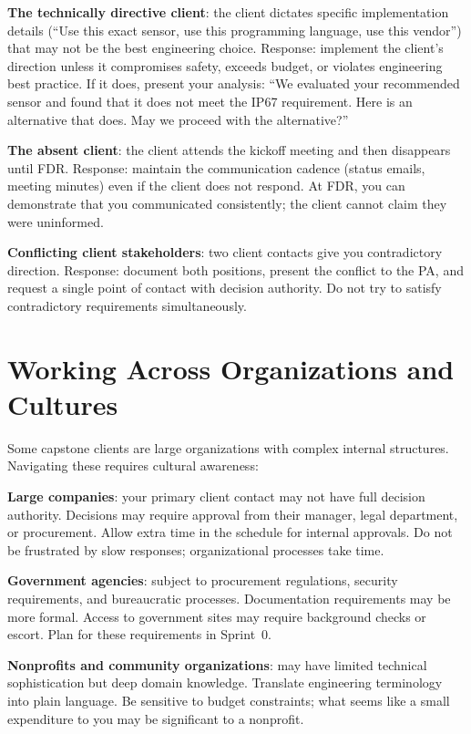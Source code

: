 \textbf{The technically directive client}: the client dictates specific implementation details (``Use this exact sensor, use this programming language, use this vendor'') that may not be the best engineering choice. Response: implement the client's direction unless it compromises safety, exceeds budget, or violates engineering best practice. If it does, present your analysis: ``We evaluated your recommended sensor and found that it does not meet the IP67 requirement. Here is an alternative that does. May we proceed with the alternative?''

\textbf{The absent client}: the client attends the kickoff meeting and then disappears until FDR. Response: maintain the communication cadence (status emails, meeting minutes) even if the client does not respond. At FDR, you can demonstrate that you communicated consistently; the client cannot claim they were uninformed.

\textbf{Conflicting client stakeholders}: two client contacts give you contradictory direction. Response: document both positions, present the conflict to the PA, and request a single point of contact with decision authority. Do not try to satisfy contradictory requirements simultaneously.



\section{Working Across Organizations and Cultures}
Some capstone clients are large organizations with complex internal structures. Navigating these requires cultural awareness:

\textbf{Large companies}: your primary client contact may not have full decision authority. Decisions may require approval from their manager, legal department, or procurement. Allow extra time in the schedule for internal approvals. Do not be frustrated by slow responses; organizational processes take time.

\textbf{Government agencies}: subject to procurement regulations, security requirements, and bureaucratic processes. Documentation requirements may be more formal. Access to government sites may require background checks or escort. Plan for these requirements in Sprint~0.

\textbf{Nonprofits and community organizations}: may have limited technical sophistication but deep domain knowledge. Translate engineering terminology into plain language. Be sensitive to budget constraints; what seems like a small expenditure to you may be significant to a nonprofit.

